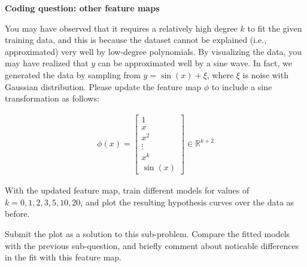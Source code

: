 \item {} {\bf Coding question: other feature maps}

You may have observed that it requires a relatively high degree $k$ to fit the given training data, and this is because the dataset cannot be explained (i.e., approximated) very well by low-degree polynomials. By visualizing the data, you may have realized that $y$ can be approximated well by a sine wave. In fact, we generated the data by sampling from $y = \sin(x) + \xi$, where $\xi$ is noise with Gaussian distribution. Please update the feature map $\phi$ to include a sine transformation as follows:

\begin{align}
\phi(x) = \left[\begin{array}{c} 1\\ x \\ x^2\\ \vdots \\x^k \\ \sin(x) \end{array}\right]\in \mathbb{R}^{k+2} \label{eqn:feature-sine}
\end{align}

With the updated feature map, train different models for values of $k=0,1,2,3,5,10,20$, and plot the resulting hypothesis curves over the data as before.

Submit the plot as a solution to this sub-problem. Compare the fitted models with the previous sub-question, and briefly comment about noticable differences in the fit with this feature map.


